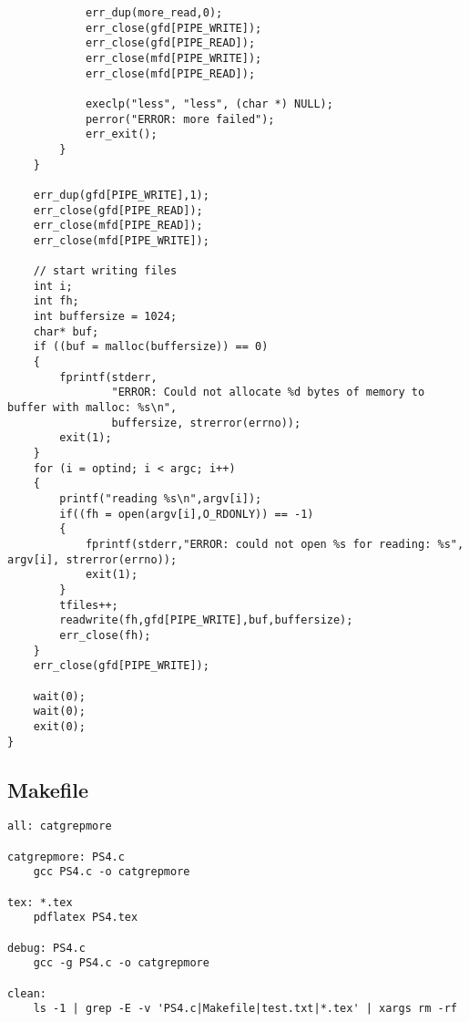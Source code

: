 \documentclass[12pt]{article}
\begin{document}
\begin{lstlisting}
            err_dup(more_read,0);
            err_close(gfd[PIPE_WRITE]);
            err_close(gfd[PIPE_READ]);
            err_close(mfd[PIPE_WRITE]);
            err_close(mfd[PIPE_READ]);

            execlp("less", "less", (char *) NULL);
            perror("ERROR: more failed");
            err_exit();
        }
    }

    err_dup(gfd[PIPE_WRITE],1);
    err_close(gfd[PIPE_READ]);
    err_close(mfd[PIPE_READ]);
    err_close(mfd[PIPE_WRITE]);
    
    // start writing files
    int i;
    int fh;
    int buffersize = 1024;
    char* buf;
    if ((buf = malloc(buffersize)) == 0)
    {
        fprintf(stderr, 
                "ERROR: Could not allocate %d bytes of memory to buffer with malloc: %s\n", 
                buffersize, strerror(errno));
        exit(1);
    }
    for (i = optind; i < argc; i++)
    {
        printf("reading %s\n",argv[i]);
        if((fh = open(argv[i],O_RDONLY)) == -1)
        {
            fprintf(stderr,"ERROR: could not open %s for reading: %s", argv[i], strerror(errno));
            exit(1);
        }
        tfiles++;
        readwrite(fh,gfd[PIPE_WRITE],buf,buffersize);
        err_close(fh);
    }
    err_close(gfd[PIPE_WRITE]);

    wait(0);
    wait(0);
    exit(0);
}

\end{lstlisting}

\subsection{Makefile}

\begin{lstlisting}
all: catgrepmore

catgrepmore: PS4.c
    gcc PS4.c -o catgrepmore

tex: *.tex
    pdflatex PS4.tex

debug: PS4.c
    gcc -g PS4.c -o catgrepmore

clean:
    ls -1 | grep -E -v 'PS4.c|Makefile|test.txt|*.tex' | xargs rm -rf
\end{lstlisting}
\end{document}
